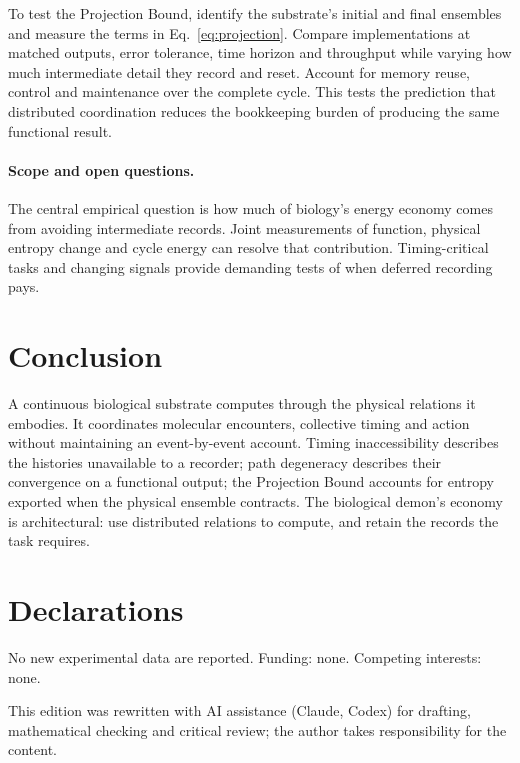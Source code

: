 \documentclass[10pt,a4paper,twocolumn]{article}
\numberwithin{equation}{section}
\begin{document}
To test the Projection Bound, identify the substrate's initial and final ensembles and measure the terms in Eq.~\eqref{eq:projection}. Compare implementations at matched outputs, error tolerance, time horizon and throughput while varying how much intermediate detail they record and reset. Account for memory reuse, control and maintenance over the complete cycle. This tests the prediction that distributed coordination reduces the bookkeeping burden of producing the same functional result.

\paragraph{Scope and open questions.}
The central empirical question is how much of biology's energy economy comes from avoiding intermediate records. Joint measurements of function, physical entropy change and cycle energy can resolve that contribution. Timing-critical tasks and changing signals provide demanding tests of when deferred recording pays.

\section{Conclusion}

A continuous biological substrate computes through the physical relations it embodies. It coordinates molecular encounters, collective timing and action without maintaining an event-by-event account. Timing inaccessibility describes the histories unavailable to a recorder; path degeneracy describes their convergence on a functional output; the Projection Bound accounts for entropy exported when the physical ensemble contracts. The biological demon's economy is architectural: use distributed relations to compute, and retain the records the task requires.

\section*{Declarations}

No new experimental data are reported. Funding: none. Competing interests: none.

This edition was rewritten with AI assistance (Claude, Codex) for drafting, mathematical checking and critical review; the author takes responsibility for the content.

\newpage
\begingroup
\small


\endgroup
\end{document}
